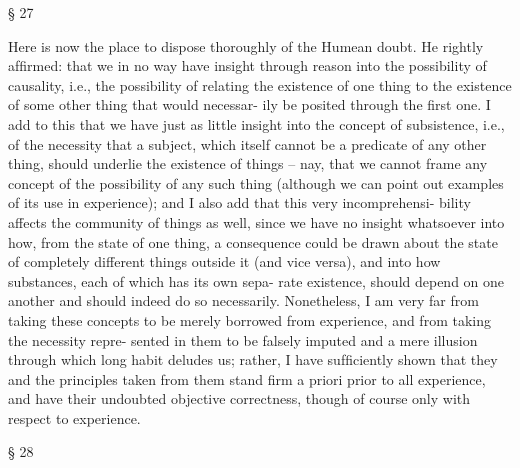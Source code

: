 § 27

Here is now the place to dispose thoroughly of the Humean doubt. He
rightly afﬁrmed: that we in no way have insight through reason into
the possibility of causality, i.e., the possibility of relating the existence
of one thing to the existence of some other thing that would necessar-
ily be posited through the ﬁrst one. I add to this that we have just as
little insight into the concept of subsistence, i.e., of the necessity that
a subject, which itself cannot be a predicate of any other thing, should
underlie the existence of things – nay, that we cannot frame any concept
of the possibility of any such thing (although we can point out examples
of its use in experience); and I also add that this very incomprehensi-
bility affects the community of things as well, since we have no insight
whatsoever into how, from the state of one thing, a consequence could
be drawn about the state of completely different things outside it (and
vice versa), and into how substances, each of which has its own sepa-
rate existence, should depend on one another and should indeed do so
necessarily. Nonetheless, I am very far from taking these concepts to be
merely borrowed from experience, and from taking the necessity repre-
sented in them to be falsely imputed and a mere illusion through which
long habit deludes us; rather, I have sufﬁciently shown that they and the
principles taken from them stand ﬁrm a priori prior to all experience,
and have their undoubted objective correctness, though of course only
with respect to experience.

§ 28

